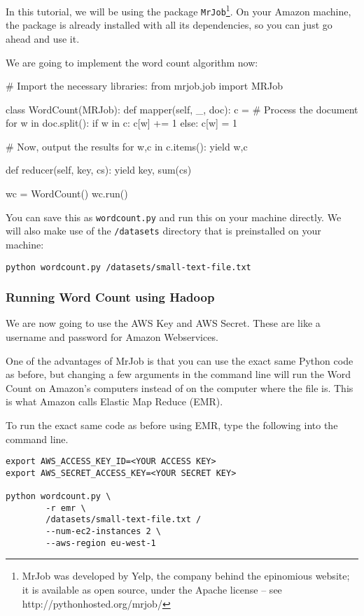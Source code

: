 In this tutorial, we will be using the package \texttt{MrJob}\footnote{MrJob was developed by Yelp, the company behind the epinomious website; it is available
as open source, under the Apache license -- see http://pythonhosted.org/mrjob/}. On your Amazon machine, the package
is already installed with all its dependencies, so you can just go ahead and
use it.

We are going to implement the word count algorithm now:

\begin{python}
# Import the necessary libraries:
from mrjob.job import MRJob

class WordCount(MRJob):
    def mapper(self, _, doc):
        c = {}
        # Process the document
        for w in doc.split():
            if w in c:
                c[w] += 1
            else:
                c[w] = 1

        # Now, output the results
        for w,c in c.items():
            yield w,c

    def reducer(self, key, cs):
        yield key, sum(cs)

wc = WordCount()
wc.run()
\end{python}

You can save this as \texttt{wordcount.py} and run this on your machine
directly. We will also make use of the \texttt{/datasets} directory that is
preinstalled on your machine:

\begin{verbatim}
python wordcount.py /datasets/small-text-file.txt
\end{verbatim}

\subsubsection{Running Word Count using Hadoop}

We are now going to use the AWS Key and AWS Secret. These are like a username
and password for Amazon Webservices.

One of the advantages of MrJob is that you can use the exact same Python code as before, but changing a few arguments in the command line will run the Word Count on Amazon's computers instead of on the computer where the file is. This is what Amazon calls Elastic Map Reduce (EMR).

To run the exact same code as before using EMR, type the following into the command line.

\begin{verbatim}
export AWS_ACCESS_KEY_ID=<YOUR ACCESS KEY>
export AWS_SECRET_ACCESS_KEY=<YOUR SECRET KEY>

python wordcount.py \
        -r emr \
        /datasets/small-text-file.txt /
        --num-ec2-instances 2 \
        --aws-region eu-west-1
\end{verbatim}

